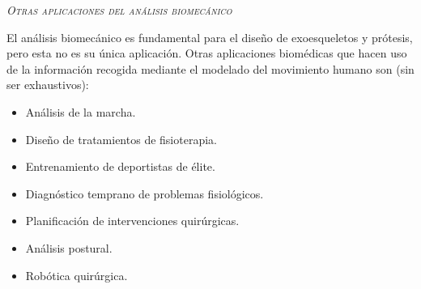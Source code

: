 \documentclass[10pt,a4paper,spanish]{article}
\newcommand{\sombreado}[2]{
  \begin{shaded}
    \begin{center} \emph{\textsc{#1}} \end{center}
    \noindent #2\\
  \end{shaded}
}
\begin{document}
\sombreado{Otras aplicaciones del análisis biomecánico}{El análisis biomecánico es fundamental para el diseño de exoesqueletos y prótesis, pero esta no es su única aplicación. Otras aplicaciones biomédicas que hacen uso de la información recogida mediante el modelado del movimiento humano son (sin ser exhaustivos):

\begin{itemize}
    \item Análisis de la marcha.
    \item Diseño de tratamientos de fisioterapia.
    \item Entrenamiento de deportistas de élite.
    \item Diagnóstico temprano de problemas fisiológicos.
    \item Planificación de intervenciones quirúrgicas.
    \item Análisis postural.
    \item Robótica quirúrgica.
\end{itemize}\strut}
\end{document}
